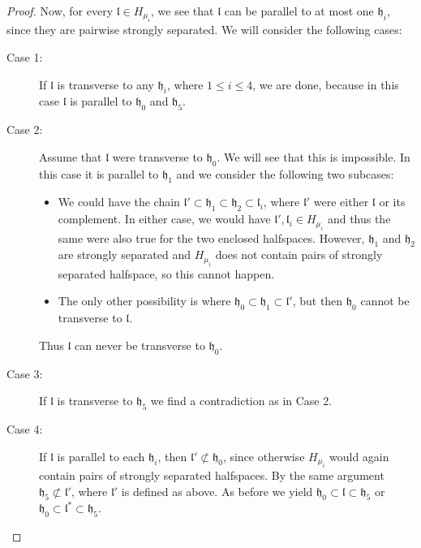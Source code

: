 \begin{proof}
  Now, for every \(\mathfrak{l} \in H_{\mu_i}\), we see that \(\mathfrak{l}\) can be parallel to at most one \(\mathfrak{h}_i\), since they are pairwise strongly separated. We will consider the following cases:
  \begin{description}
  \item[Case 1:] If \(\mathfrak{l}\) is transverse to any \(\mathfrak{h}_i\), where \(1 \leq i \leq 4\), we are done, because in this case \(\mathfrak{l}\) is parallel to \(\mathfrak{h}_0\) and \(\mathfrak{h}_5\).
  \item[Case 2:] Assume that \(\mathfrak{l}\) were transverse to \(\mathfrak{h}_0\). We will see that this is impossible. In this case it is parallel to \(\mathfrak{h}_1\) and we consider the following two subcases:
    \begin{itemize}
    \item We could have the chain \(\mathfrak{l}' \subset \mathfrak{h}_1 \subset \mathfrak{h}_2 \subset \mathfrak{l}_i\), where \(\mathfrak{l}'\) were either \(\mathfrak{l}\) or its complement. In either case, we would have \(\mathfrak{l}', \mathfrak{l}_i \in H_{\mu_i}\) and thus the same were also true for the two enclosed halfspaces. However, \(\mathfrak{h}_1\) and \(\mathfrak{h}_2\) are strongly separated and \(H_{\mu_i}\) does not contain pairs of strongly separated halfspace, so this cannot happen.
    \item The only other possibility is where \(\mathfrak{h}_0 \subset \mathfrak{h}_1 \subset \mathfrak{l}'\), but then \(\mathfrak{h}_0\) cannot be transverse to \(\mathfrak{l}\). 
    \end{itemize}
    Thus \(\mathfrak{l}\) can never be transverse to \(\mathfrak{h}_0\). 
  \item[Case 3:] If \(\mathfrak{l}\) is transverse to \(\mathfrak{h}_5\) we find a contradiction as in Case 2.
  \item[Case 4:] If \(\mathfrak{l}\) is parallel to each \(\mathfrak{h}_i\), then \(\mathfrak{l}' \not\subset \mathfrak{h_0}\), since otherwise \(H_{\mu_i}\) would again contain pairs of strongly separated halfspaces. By the same argument \(\mathfrak{h}_5 \not\subset \mathfrak{l}'\), where \(\mathfrak{l}'\) is defined as above. As before we yield \(\mathfrak{h}_0 \subset \mathfrak{l} \subset \mathfrak{h}_5\) or \(\mathfrak{h}_0 \subset \mathfrak{l}^\ast \subset \mathfrak{h}_5\).
  \end{description}
\end{proof}

